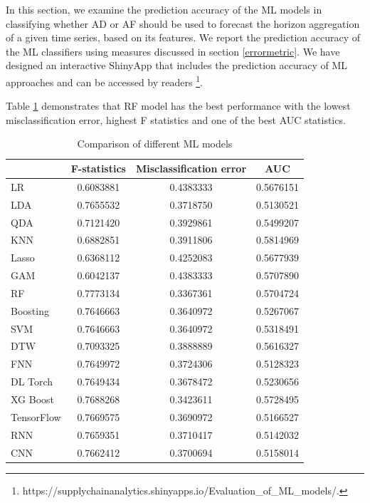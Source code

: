 \documentclass[preprint, 3p,
authoryear]{elsarticle} %
\begin{document}
In this section, we examine the prediction accuracy of the ML models in
classifying whether AD or AF should be used to forecast the horizon
aggregation of a given time series, based on its features. We report the
prediction accuracy of the ML classifiers using measures discussed in
section \ref{errormetric}. We have designed an interactive ShinyApp that
includes the prediction accuracy of ML approaches and can be accessed by
readers \footnote{https://supplychainanalytics.shinyapps.io/Evaluation\_of\_ML\_models/.}.

Table \ref{tab:cost} demonstrates that RF model has the best performance
with the lowest misclassification error, highest F statistics and one of
the best AUC statistics.

\begin{table}
\caption{\label{tab:cost}Comparison of different ML models}
\centering
\begin{tabular}[t]{lccc}
\hline
 & F-statistics & Misclassification error & AUC\\
\hline
LR &  0.6083881 &  0.4383333 & 0.5676151\\
\hline
LDA & 0.7655532 & 0.3718750 & 0.5130521\\
\hline
QDA &  0.7121420 & 0.3929861 & 0.5499207\\
\hline
KNN &  0.6882851 & 0.3911806 & 0.5814969\\
\hline
Lasso & 0.6368112 & 0.4252083 & 0.5677939\\
\hline
GAM &  0.6042137 & 0.4383333 & 0.5707890\\
\hline
RF & 0.7773134 & 0.3367361 & 0.5704724\\
\hline
Boosting & 0.7646663 & 0.3640972 & 0.5267067\\
\hline
SVM & 0.7646663 & 0.3640972 & 0.5318491\\
\hline
DTW & 0.7093325 & 0.3888889 & 0.5616327\\
\hline
FNN & 0.7649972 & 0.3724306 & 0.5128323\\
\hline
DL Torch & 0.7649434 & 0.3678472 & 0.5230656\\
\hline
XG Boost & 0.7688268 & 0.3423611 & 0.5728495\\
\hline
TensorFlow & 0.7669575 & 0.3690972 & 0.5166527\\
\hline
RNN & 0.7659351 & 0.3710417 & 0.5142032\\
\hline
CNN & 0.7662412 & 0.3700694 & 0.5158014\\
\hline
\end{tabular}
\end{table}
\end{document}
